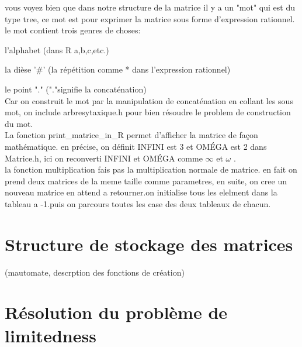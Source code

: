 \documentclass{report}
\begin{document}
vous voyez bien que dans notre structure de la matrice il y a un "mot" qui est du type tree, ce mot est pour exprimer la matrice sous forme d'expression rationnel. le mot contient trois genres de choses: 

	l'alphabet  (dans R a,b,c,etc.)

    la dièse '$\#$'  (la répétition comme * dans l'expression rationnel)

    le point "."  ("."signifie la concaténation)\\
Car on construit le mot par la manipulation de concaténation en collant les sous mot, on include arbresytaxique.h pour bien résoudre le problem de construction du mot.\\

La fonction print\_matrice\_in\_R permet d'afficher la matrice de façon mathématique. en précise, on définit INFINI est 3 et OMÉGA est 2 dans Matrice.h, ici on reconverti INFINI et OMÉGA comme $\infty$ et $\omega$ .\\

la fonction multiplication fais pas la multiplication normale de matrice. en fait on prend deux matrices de la meme taille comme parametres, en suite, on cree un nouveau matrice en attend a retourner.on initialise tous les elelment dans la tableau a -1.puis on  parcours toutes les case des deux tableaux de chacun.


\chapter{Structure de stockage des matrices}

(mautomate, descrption des fonctions de création)

\chapter{Résolution du problème de limitedness}



\end{document}
